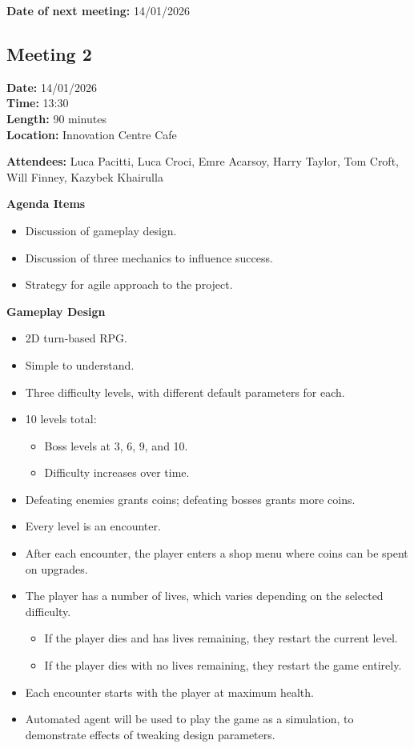 \documentclass[11pt]{article}
\begin{document}
    \textbf{Date of next meeting:} 14/01/2026



    \vspace{1.5\baselineskip}
    \subsection{Meeting 2}

    \textbf{Date:} 14/01/2026 \\
    \textbf{Time:} 13:30 \\
    \textbf{Length:} 90 minutes \\
    \textbf{Location:} Innovation Centre Cafe

    \textbf{Attendees:} Luca Pacitti, Luca Croci, Emre Acarsoy, Harry Taylor, Tom Croft, Will Finney, Kazybek Khairulla

    \textbf{Agenda Items}
    \begin{itemize}
        \item Discussion of gameplay design.
        \item Discussion of three mechanics to influence success.
        \item Strategy for agile approach to the project.
    \end{itemize}

    \textbf{Gameplay Design}
    \begin{itemize}
        \item 2D turn-based RPG.
        \item Simple to understand.
        \item Three difficulty levels, with different default parameters for each.
        \item 10 levels total:
        \begin{itemize}
            \item Boss levels at 3, 6, 9, and 10.
            \item Difficulty increases over time.
        \end{itemize}
        \item Defeating enemies grants coins; defeating bosses grants more coins.
        \item Every level is an encounter.
        \item After each encounter, the player enters a shop menu where coins can be spent on upgrades.
        \item The player has a number of lives, which varies depending on the selected difficulty.
        \begin{itemize}
            \item If the player dies and has lives remaining, they restart the current level.
            \item If the player dies with no lives remaining, they restart the game entirely.
        \end{itemize}
        \item Each encounter starts with the player at maximum health.
        \item Automated agent will be used to play the game as a simulation, to demonstrate effects of tweaking design parameters.
    \end{itemize}
\end{document}
